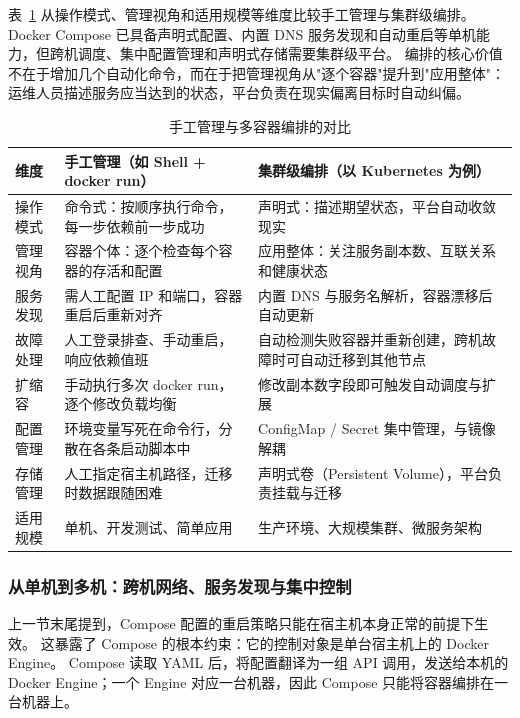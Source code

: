 表~\ref{tab:manual-vs-orchestration} 从操作模式、管理视角和适用规模等维度比较手工管理与集群级编排。
Docker Compose 已具备声明式配置、内置 DNS 服务发现和自动重启等单机能力，但跨机调度、集中配置管理和声明式存储需要集群级平台。
编排的核心价值不在于增加几个自动化命令，而在于把管理视角从"逐个容器"提升到"应用整体"：运维人员描述服务应当达到的状态，平台负责在现实偏离目标时自动纠偏。

\begin{table}[htbp]
\centering
\caption{手工管理与多容器编排的对比}
\label{tab:manual-vs-orchestration}
{\setlength{\tabcolsep}{4pt}
\begin{tabular}{|p{}|p{}|p{}|}
\hline
维度 & 手工管理（如 Shell + docker run） & 集群级编排（以 Kubernetes 为例） \\
\hline
操作模式 & 命令式：按顺序执行命令，每一步依赖前一步成功 & 声明式：描述期望状态，平台自动收敛现实 \\
\hline
管理视角 & 容器个体：逐个检查每个容器的存活和配置 & 应用整体：关注服务副本数、互联关系和健康状态 \\
\hline
服务发现 & 需人工配置 IP 和端口，容器重启后重新对齐 & 内置 DNS 与服务名解析，容器漂移后自动更新 \\
\hline
故障处理 & 人工登录排查、手动重启，响应依赖值班 & 自动检测失败容器并重新创建，跨机故障时可自动迁移到其他节点 \\
\hline
扩缩容 & 手动执行多次 docker run，逐个修改负载均衡 & 修改副本数字段即可触发自动调度与扩展 \\
\hline
配置管理 & 环境变量写死在命令行，分散在各条启动脚本中 & ConfigMap / Secret 集中管理，与镜像解耦 \\
\hline
存储管理 & 人工指定宿主机路径，迁移时数据跟随困难 & 声明式卷（Persistent Volume），平台负责挂载与迁移 \\
\hline
适用规模 & 单机、开发测试、简单应用 & 生产环境、大规模集群、微服务架构 \\
\hline
\end{tabular}
}
\end{table}

\subsubsection{从单机到多机：跨机网络、服务发现与集中控制}

上一节末尾提到，Compose 配置的重启策略只能在宿主机本身正常的前提下生效。
这暴露了 Compose 的根本约束：它的控制对象是单台宿主机上的 Docker Engine。
Compose 读取 YAML 后，将配置翻译为一组 API 调用，发送给本机的 Docker Engine；一个 Engine 对应一台机器，因此 Compose 只能将容器编排在一台机器上。

